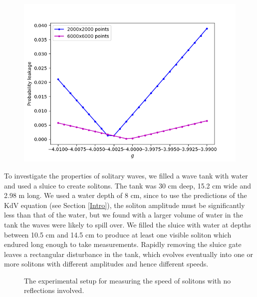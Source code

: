\documentclass[10pt, twocolumn]{revtex4}    %
\begin{document}
\begin{figure}[h]
\includegraphics[width=\columnwidth]{errors.png}
\end{figure}




To investigate the properties of solitary waves, we filled a wave tank with water and used a sluice to create solitons. The tank was 30 cm deep, 15.2 cm wide and 2.98 m long. We used a water depth of 8 cm, since to use the predictions of the KdV equation (see Section \ref{Intro}), the soliton amplitude must be significantly less than that of the water, but we found with a larger volume of water in the tank the waves were likely to spill over. We filled the sluice with water at depths between 10.5 cm and 14.5 cm to produce at least one visible soliton which endured long enough to take measurements. Rapidly removing the sluice gate leaves a rectangular disturbance in the tank, which evolves eventually into one or more solitons with different amplitudes and hence different speeds. 

\begin{figure}[h]
\caption{The experimental setup for measuring the speed of solitons with no reflections involved.}
\label{Diagram1}
\end{figure}
\end{document}
